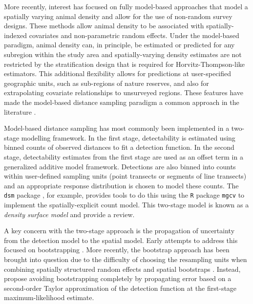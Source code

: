 \documentclass{statsoc}
\begin{document}
More recently, interest has focused on fully model-based approaches that model a spatially varying animal density and allow for the use of non-random survey designs.  These methods allow animal density to be associated with spatially-indexed covariates and non-parametric random effects.  Under the model-based paradigm, animal density can, in principle, be estimated or predicted for any subregion within the study area \citep{buckland_model-based_2016, miller_spatial_2013, johnson_model-based_2010} and spatially-varying density estimates are not restricted by the stratification design that is required for Horvitz-Thompson-like estimators.  This additional flexibility allows for predictions at user-specified geographic units, such as sub-regions of nature reserves, and also for extrapolating covariate relationships to unsurveyed regions.  These features have made the model-based distance sampling paradigm a common approach in the literature \citep{garciabaron_modelling_2019, herr_aerial_2019, breen_new_2017, williams_chilean_2011, stokes_monitoring_2010, williams_modeling_2006}.

Model-based distance sampling has most commonly been implemented in a two-stage modelling framework.  In the first stage, detectability is estimated using binned counts of observed distances to fit a detection function.  In the second stage, detectability estimates from the first stage are used as an offset term in a generalized additive model framework.  Detections are also binned into counts within user-defined sampling units (point transects or segments of line transects) and an appropriate response distribution is chosen to model these counts.  The \texttt{dsm} package \citep{miller_spatial_2013}, for example, provides tools to do this using the \texttt{R} package \texttt{mgcv} \citep{wood_gam_2017} to implement the spatially-explicit count model.  This two-stage model is known as a \textit{density surface model} and \cite{miller_spatial_2013} provide a review.

A key concern with the two-stage approach is the propagation of uncertainty from the detection model to the spatial model.  Early attempts to address this focused on bootstrapping \citep{hedley_spatial_2004, lahiri_resampling_2003}.  More recently, the bootstrap approach has been brought into question due to the difficulty of choosing the resampling units when combining spatially structured random effects and spatial bootstraps \citep{bravington_VariancePropagationDensity_2021, williams_chilean_2011}. Instead, \cite{bravington_VariancePropagationDensity_2021} propose avoiding bootstrapping completely by propagating error based on a second-order Taylor approximation of the detection function at the first-stage maximum-likelihood estimate.
\end{document}
